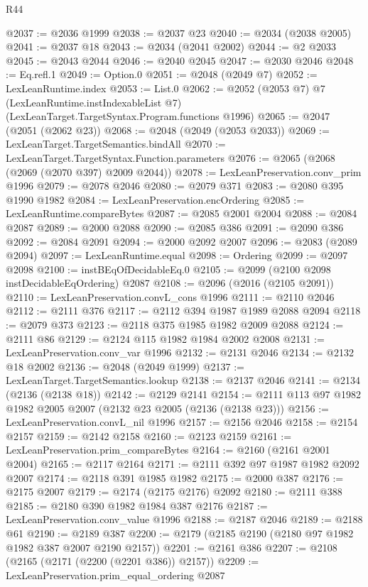 \begin{lexlean}{R44}
\begin{coremodule}
@2037 := @2036 @1999
@2038 := @2037 @23
@2040 := @2034 (@2038 @2005)
@2041 := @2037 @18
@2043 := @2034 (@2041 @2002)
@2044 := @2 @2033
@2045 := @2043 @2044
@2046 := @2040 @2045
@2047 := @2030 @2046
@2048 := Eq.refl.{1}
@2049 := Option.{0}
@2051 := @2048 (@2049 @7)
@2052 := LexLeanRuntime.index
@2053 := List.{0}
@2062 := @2052
    (@2053 @7)
    @7
    (LexLeanRuntime.instIndexableList @7)
    (LexLeanTarget.TargetSyntax.Program.functions @1996)
@2065 := @2047 (@2051 (@2062 @23))
@2068 := @2048 (@2049 (@2053 @2033))
@2069 := LexLeanTarget.TargetSemantics.bindAll
@2070 := LexLeanTarget.TargetSyntax.Function.parameters
@2076 := @2065 (@2068 (@2069 (@2070 @397) @2009 @2044))
@2078 := LexLeanPreservation.conv_prim @1996
@2079 := @2078 @2046
@2080 := @2079 @371
@2083 := @2080 @395 @1990 @1982
@2084 := LexLeanPreservation.encOrdering
@2085 := LexLeanRuntime.compareBytes
@2087 := @2085 @2001 @2004
@2088 := @2084 @2087
@2089 := @2000 @2088
@2090 := @2085 @386
@2091 := @2090 @386
@2092 := @2084 @2091
@2094 := @2000 @2092 @2007
@2096 := @2083 (@2089 @2094)
@2097 := LexLeanRuntime.equal
@2098 := Ordering
@2099 := @2097 @2098
@2100 := instBEqOfDecidableEq.{0}
@2105 := @2099 (@2100 @2098 instDecidableEqOrdering) @2087
@2108 := @2096 (@2016 (@2105 @2091))
@2110 := LexLeanPreservation.convL_cons @1996
@2111 := @2110 @2046
@2112 := @2111 @376
@2117 := @2112 @394 @1987 @1989 @2088 @2094
@2118 := @2079 @373
@2123 := @2118 @375 @1985 @1982 @2009 @2088
@2124 := @2111 @86
@2129 := @2124 @115 @1982 @1984 @2002 @2008
@2131 := LexLeanPreservation.conv_var @1996
@2132 := @2131 @2046
@2134 := @2132 @18 @2002
@2136 := @2048 (@2049 @1999)
@2137 := LexLeanTarget.TargetSemantics.lookup
@2138 := @2137 @2046
@2141 := @2134 (@2136 (@2138 @18))
@2142 := @2129 @2141
@2154 := @2111 @113 @97 @1982 @1982 @2005 @2007 (@2132 @23 @2005 (@2136 (@2138 @23)))
@2156 := LexLeanPreservation.convL_nil @1996
@2157 := @2156 @2046
@2158 := @2154 @2157
@2159 := @2142 @2158
@2160 := @2123 @2159
@2161 := LexLeanPreservation.prim_compareBytes
@2164 := @2160 (@2161 @2001 @2004)
@2165 := @2117 @2164
@2171 := @2111 @392 @97 @1987 @1982 @2092 @2007
@2174 := @2118 @391 @1985 @1982
@2175 := @2000 @387
@2176 := @2175 @2007
@2179 := @2174 (@2175 @2176) @2092
@2180 := @2111 @388
@2185 := @2180 @390 @1982 @1984 @387 @2176
@2187 := LexLeanPreservation.conv_value @1996
@2188 := @2187 @2046
@2189 := @2188 @61
@2190 := @2189 @387
@2200 := @2179 (@2185 @2190 (@2180 @97 @1982 @1982 @387 @2007 @2190 @2157))
@2201 := @2161 @386
@2207 := @2108 (@2165 (@2171 (@2200 (@2201 @386)) @2157))
@2209 := LexLeanPreservation.prim_equal_ordering @2087

\end{coremodule}
\end{lexlean}
